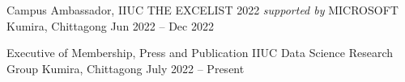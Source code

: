\begin{cventries}
  \cventry
    {Campus Ambassador, IIUC} %
    {THE EXCELIST 2022 \textit{supported by} MICROSOFT} %
    {Kumira, Chittagong} %
    {Jun 2022 – Dec 2022} %
    {
    }


  \cventry
    {Executive of Membership, Press and Publication} %
    {IIUC Data Science Research Group} %
    {Kumira, Chittagong} %
    {July 2022 – Present} %
    {
    }


\end{cventries}
